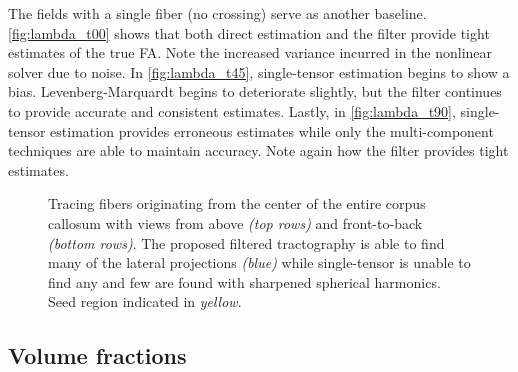 \documentclass[final,hyperref]{gatech-thesis}
\begin{document}
The fields with a single fiber (no crossing) serve as another baseline.
\autoref{fig:lambda_t00} shows that both direct estimation and the filter
provide tight estimates of the true FA.  Note the increased variance incurred
in the nonlinear solver due to noise.
%
In \autoref{fig:lambda_t45}, single-tensor estimation begins to show a bias.
Levenberg-Marquardt begins to deteriorate slightly, but the filter continues
to provide accurate and consistent estimates.
%
Lastly, in \autoref{fig:lambda_t90}, single-tensor estimation provides
erroneous estimates while only the multi-component techniques are able to
maintain accuracy.  Note again how the filter provides tight estimates.

\begin{figure}[th]
  \centering
  \caption{Tracing fibers originating from the center of the entire corpus
    callosum with views from above \textit{(top rows)} and front-to-back
    \textit{(bottom rows)}.  The proposed filtered tractography is able to
    find many of the lateral projections \textit{(blue)} while single-tensor
    is unable to find any and few are found with sharpened spherical
    harmonics.  Seed region indicated in \textit{yellow}.}
  \label{fig:T_cc}
\end{figure}



\subsection{Volume fractions}  \label{sec:weights}
\end{document}
